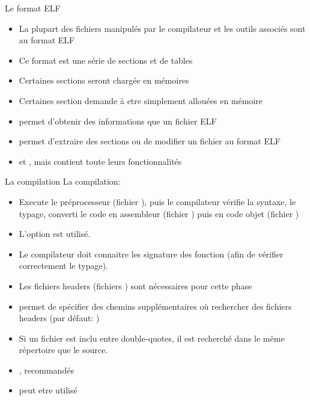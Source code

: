 \begin{frame}[fragile=singleslide]{Le format ELF}
  \begin{itemize}
  \item La  plupart des fichiers  manipulés par le compilateur  et les
    outils associés sont au format ELF
  \item Ce format est une série de sections et de tables
  \item  Certaines sections seront chargée en mémoires
  \item  Certaines  section  demande  à etre  simplement  allouées  en
    mémoire
  \item  {} permet  d'obtenir des  informations  que un
    fichier ELF
  \item  {}  permet   d'extraire  des  sections  ou  de
    modifier un fichier au format ELF
  \item {}  et , mais   contient
    toute leurs fonctionnalités
  \end{itemize}
\end{frame}

\begin{frame}[fragile=singleslide]{La compilation}
  La compilation:
  \begin{itemize}
  \item  Execute   le  préprocesseur  (fichier   ),  puis  le
    compilateur  vérifie la syntaxe,  le typage,  converti le  code en
    assembleur  (fichier  )   puis  en  code  objet  (fichier
    )
  \item L'option  est utilisé.
  \item Le compilateur doit connaitre les signature des fonction (afin
    de vérifier correctement le typage).
  \item  Les fichiers  headers (fichiers  )  sont nécessaires
    pour cette phase
  \item {}  permet de spécifier des  chemins supplémentaires où
    rechercher des fichiers headers (par défaut: )
  \item Si un fichier est  inclu entre double-quotes, il est recherché
    dans le même répertoire que le source.
  \item {},  recommandés
  \item {} peut etre utilisé
  \end{itemize}
\end{frame}

